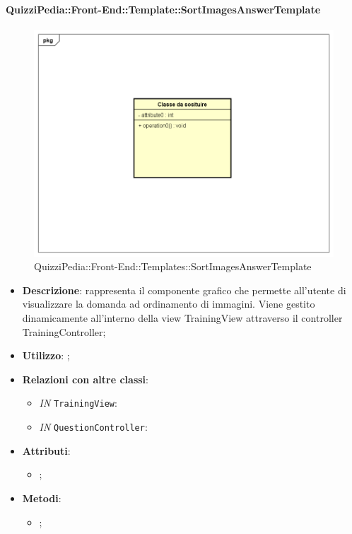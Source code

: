 		\paragraph{QuizziPedia::Front-End::Template::SortImagesAnswerTemplate}
		
				\label{QuizziPedia::Front-End::Templates::SortImagesAnswerTemplate}

				\begin{figure}[h]
					\centering
					\includegraphics[scale=0.5,keepaspectratio]{UML/Classi/Front-End/Temporanea.png}
					\caption{QuizziPedia::Front-End::Templates::SortImagesAnswerTemplate}
				\end{figure}
				
			\begin{itemize}
				\item \textbf{Descrizione}: rappresenta il componente grafico che permette all'utente di visualizzare la domanda ad ordinamento di immagini. Viene gestito dinamicamente all'interno della view TrainingView attraverso il controller TrainingController;
				\item \textbf{Utilizzo}: ;
				\item \textbf{Relazioni con altre classi}: 
				\begin{itemize}
						\item \textit{IN} \texttt{TrainingView}: 
						\item \textit{IN} \texttt{QuestionController}:
				\end{itemize}
				\item \textbf{Attributi}: 
				\begin{itemize}
					\item ;
				\end{itemize}
				\item \textbf{Metodi}: 
				\begin{itemize}
					\item ;
				\end{itemize}
			\end{itemize}
		
